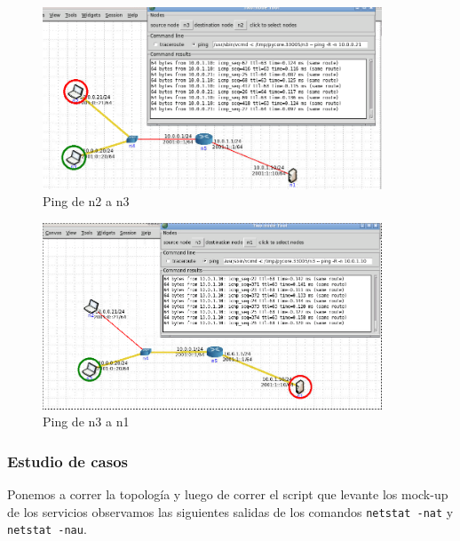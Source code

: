 \begin{figure}[!ht]
   \centering
   \includegraphics[width=0.9\textwidth]{img/ping-n2-n3}
   \caption{Ping de n2 a n3}
   \centering
   \label{label:file_name}
\end{figure}

\begin{figure}[!ht]
   \centering
   \includegraphics[width=0.9\textwidth]{img/ping-n3-n1}
   \caption{Ping de n3 a n1}
   \centering
   \label{label:file_name}
\end{figure}
\pagebreak

\subsubsection*{Estudio de casos}

Ponemos a correr la topología y luego de correr el script que levante los mock-up de los servicios observamos las siguientes salidas de los comandos \texttt{netstat -nat} y \texttt{netstat -nau}.

